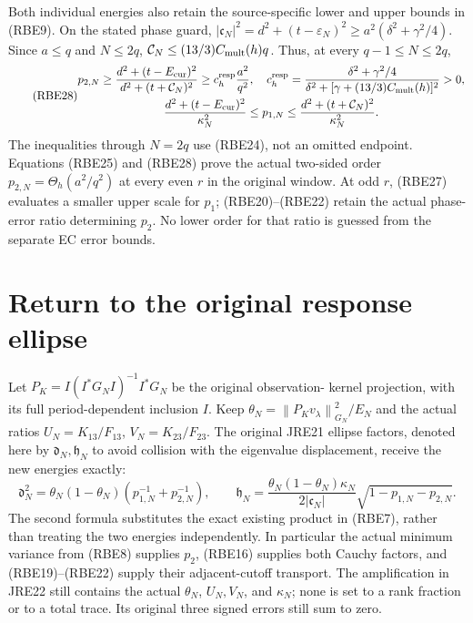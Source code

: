 \documentclass[11pt]{article}
\newcommand{\norm}[1]{\left\lVert#1\right\rVert}
\begin{document}
Both individual energies also retain the source-specific lower and
upper bounds in (RBE9). On the stated phase guard,
\(|\mathfrak c_N|^2=d^2+(t-\varepsilon_N)^2
\ge a^2(\delta^2+\gamma^2/4)\). Since \(a\le q\) and
\(N\le2q\),
\(\mathcal C_N\le(13/3)C_{\rm mult}(h)q\).
Thus, at every \(q-1\le N\le2q\),
\begin{equation}\tag{RBE28}
 \begin{gathered}
 p_{2,N}\ge\frac{d^2+(t-E_{\rm cur})^2}
                       {d^2+(t+\mathcal C_N)^2}
 \ge c_h^{\rm resp}\frac{a^2}{q^2},\quad
 c_h^{\rm resp}=\frac{\delta^2+\gamma^2/4}
 {\delta^2+[\gamma+(13/3)C_{\rm mult}(h)]^2}>0,\\
 \frac{d^2+(t-E_{\rm cur})^2}{\kappa_N^2}
 \le p_{1,N}\le
 \frac{d^2+(t+\mathcal C_N)^2}{\kappa_N^2}.
 \end{gathered}
\end{equation}
The inequalities through \(N=2q\) use (RBE24), not an omitted
endpoint. Equations (RBE25) and (RBE28) prove the actual two-sided
order \(p_{2,N}=\Theta_h(a^2/q^2)\) at every even \(r\) in
the original window. At odd \(r\), (RBE27) evaluates a smaller
upper scale for \(p_1\); (RBE20)--(RBE22) retain the actual
phase-error ratio determining \(p_2\). No lower order for that
ratio is guessed from the separate EC error bounds.

\section{Return to the original response ellipse}

Let \(P_K=I(I^*G_NI)^{-1}I^*G_N\) be the original observation-
kernel projection, with its full period-dependent inclusion \(I\).
Keep \(\theta_N=\norm{P_Kv_\lambda}_{G_N}^2/E_N\) and the
actual ratios \(U_N=K_{13}/F_{13}\), \(V_N=K_{23}/F_{23}\).
The original JRE21 ellipse factors, denoted here by
\(\mathfrak d_N,\mathfrak h_N\) to avoid collision with
the eigenvalue displacement, receive the new energies exactly:
\begin{equation}\tag{RBE29}
 \mathfrak d_N^2=\theta_N(1-\theta_N)
                   (p_{1,N}^{-1}+p_{2,N}^{-1}),\qquad
 \mathfrak h_N=
 \frac{\theta_N(1-\theta_N)\kappa_N}{2|\mathfrak c_N|}
                   \sqrt{1-p_{1,N}-p_{2,N}}.
\end{equation}
The second formula substitutes the exact existing product in
(RBE7), rather than treating the two energies independently.
In particular the actual minimum variance from (RBE8) supplies
\(p_2\), (RBE16) supplies both Cauchy factors, and (RBE19)--(RBE22)
supply their adjacent-cutoff transport. The amplification in JRE22
still contains the actual \(\theta_N\), \(U_N,V_N\), and
\(\kappa_N\); none is set to a rank fraction or to a total
trace. Its original three signed errors still sum to zero.
\end{document}

